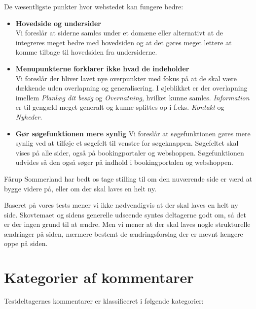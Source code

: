 \documentclass[10pt,a4paper]{article}      %
\begin{document}
\noindent De væsentligste punkter hvor webstedet kan fungere bedre:
\begin{itemize}
    \item \textbf{Hovedside og undersider}\\
        Vi foreslår at siderne samles under et
        domæne eller alternativt at de integreres meget bedre med hovedsiden og at det gøres
        meget lettere at komme tilbage til hovedsiden fra undersiderne.

    \item \textbf{Menupunkterne forklarer ikke hvad de indeholder}\\
        Vi foreslår der bliver lavet nye overpunkter med fokus på at de skal være dækkende
        uden overlapning og generalisering. I øjeblikket er der overlapning imellem
        \emph{Planlæg dit besøg} og \emph{Overnatning}, hvilket kunne samles.
        \emph{Information} er til gengæld meget generalt og kunne splittes op i f.eks.
        \emph{Kontakt} og \emph{Nyheder}.

    \item \textbf{Gør søgefunktionen mere synlig}
        Vi foreslår at søgefunktionen gøres mere synlig ved at tilføje et søgefelt til venstre for søgeknappen. Søgefeltet skal vises på alle sider, også på bookingportaler og webshoppen. Søgefunktionen udvides så den også søger på indhold i bookingportalen og webshoppen.

\end{itemize}

\noindent Fårup Sommerland har bedt os tage stilling til om den nuværende side er værd at bygge videre på, eller om der skal laves en helt ny.

Baseret på vores tests mener vi ikke nødvendigvis at der skal laves en helt ny side. Skovtemaet og sidens generelle udseende syntes deltagerne godt om, så det er der ingen grund til at ændre. Men vi mener at der skal laves nogle strukturelle ændringer på siden, nærmere bestemt de ændringsforslag der er nævnt længere oppe på siden.

\clearpage

\tableofcontents
\clearpage


\section{Kategorier af kommentarer}
Testdeltagernes kommentarer er klassificeret i følgende kategorier:
\end{document}
